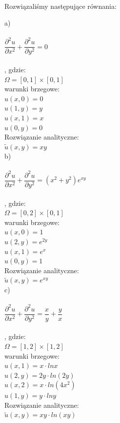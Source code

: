 Rozwiązaliśmy następujące równania:
\begin{multicols}{3}
	a)\\\\$\dfrac{\partial^2 u}{\partial x^2} + \dfrac{\partial^2 u}{\partial y^2} = 0$\vspace{0.2cm}\\\\, gdzie:\\
	$\Omega = [0,1]\times[0,1]$\\
	warunki brzegowe:\\
	$u(x,0) = 0$\\
	$u(1,y) = y$\\
	$u(x,1) = x$\\
	$u(0,y) = 0$
	\vspace{0.1cm}\\
	Rozwiązanie analityczne:\\
	\columnbreak
	$\widetilde{u}(x,y) = xy$\\
	b)\\\\$\dfrac{\partial^2 u}{\partial x^2} + \dfrac{\partial^2 u}{\partial y^2} = (x^2+y^2)e^{xy}$\vspace{0.2cm}\\\\, gdzie:\\
	$\Omega = [0,2]\times[0,1]$\\
	warunki brzegowe:\\
	$u(x,0) = 1$\\
	$u(2,y) = e^{2y}$\\
	$u(x,1) = e^x$\\	
	$u(0,y) = 1$
	\vspace{0.1cm}\\
	Rozwiązanie analityczne:\\
	\columnbreak
	$\widetilde{u}(x,y) = e^{xy}$\\
	c)\\\\$\dfrac{\partial^2 u}{\partial x^2} + \dfrac{\partial^2 u}{\partial y^2} = \dfrac{x}{y} + \dfrac{y}{x}$\vspace{0cm}\\\\, gdzie:\\
	$\Omega = [1,2]\times[1,2]$\\
	warunki brzegowe:\\
	$u(x,1) = x\cdot lnx$\\
	$u(2,y) = 2y\cdot ln(2y)$\\
	$u(x,2) = x\cdot ln(4x^2)$\\
	$u(1,y) = y\cdot lny$
	\vspace{0.1cm}\\
	Rozwiązanie analityczne:\\
	$\widetilde{u}(x,y) = xy\cdot ln(xy)$
	
	
\end{multicols}

